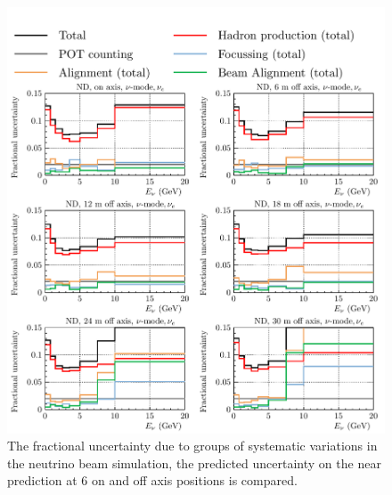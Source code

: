 \documentclass{article}
\begin{document}
\begin{figure}
  \centering
  \includegraphics[width=\textwidth]{plots/fracerrs/numode_nue_ErrType_OffAxis}
  \caption{The fractional uncertainty due to groups of systematic variations in the neutrino beam simulation, the predicted uncertainty on the near prediction at 6 on and off axis positions is compared.}
  \label{fig:grp_nu_nue_offaxis}
\end{figure}
\end{document}

